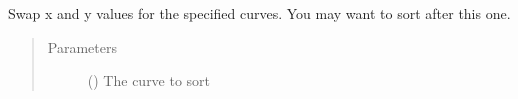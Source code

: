 \documentclass[letterpaper,10pt,english]{sphinxmanual}
\begin{document}

\begin{fulllineitems}
\label{\detokenize{pydv:pydvpy.rev}}
Swap x and y values for the specified curves. You may want to sort after this one.

\begin{sphinxVerbatim}[commandchars=\\\{\}]
   
\end{sphinxVerbatim}

\begin{sphinxVerbatim}[commandchars=\\\{\}]
\end{sphinxVerbatim}
\begin{quote}\begin{description}
\item[{Parameters}] \leavevmode
{} ({\hyperref[\detokenize{pydv:curve.Curve}]{}}) \textendash{} The curve to sort

\end{description}\end{quote}

\end{fulllineitems}

\end{document}
